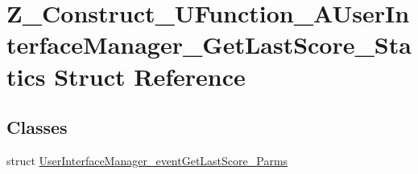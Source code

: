 \hypertarget{struct_z___construct___u_function___a_user_interface_manager___get_last_score___statics}{}\section{Z\+\_\+\+Construct\+\_\+\+U\+Function\+\_\+\+A\+User\+Interface\+Manager\+\_\+\+Get\+Last\+Score\+\_\+\+Statics Struct Reference}
\label{struct_z___construct___u_function___a_user_interface_manager___get_last_score___statics}
\subsection*{Classes}
\begin{DoxyCompactItemize}
\item 
struct \mbox{\hyperlink{struct_z___construct___u_function___a_user_interface_manager___get_last_score___statics_1_1_user926d34881b3e8be3d0bccfb5d9183fea}{User\+Interface\+Manager\+\_\+event\+Get\+Last\+Score\+\_\+\+Parms}}
\end{DoxyCompactItemize}
